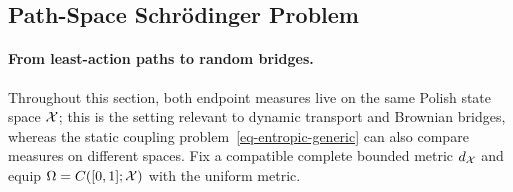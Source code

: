 \subsection{Path-Space Schr\"odinger Problem}
\label{sec-path-space-schrodinger}
\paragraph{From least-action paths to random bridges.}
Throughout this section, both endpoint measures live on the same Polish state space $\mathcal{X}$; this is the setting relevant to dynamic transport and Brownian bridges, whereas the static coupling problem~\eqref{eq-entropic-generic} can also compare measures on different spaces. Fix a compatible complete bounded metric $d_{\mathcal{X}}$ and equip $\Omega=C([0,1];\mathcal{X})$ with the uniform metric.

